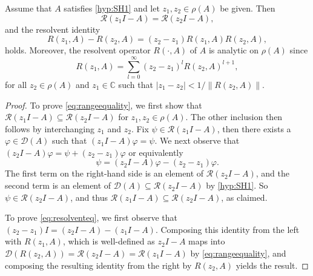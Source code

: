 \documentclass[english]{myarticle}
\begin{document}
\begin{sloppypar}
\begin{proposition} \label{prop:resolventproperties}
Assume that $A$ satisfies \ref{hyp:SH1} and let $z_1, z_2 \in \rho(A)$ be given. Then
\begin{equation} \label{eq:rangeequality}
    \mathcal{R}(z_1I - A) = \mathcal{R}(z_2I - A),
\end{equation}
and the resolvent identity
\begin{equation} \label{eq:resolventeq}
R(z_1,A)-R(z_2,A) = (z_2-z_1)R(z_1,A)R(z_2,A),
\end{equation}
holds. Moreover, the resolvent operator $R(\cdot,A)$ of $A$ is analytic on $\rho(A)$ since
\begin{equation} \label{eq:resolventseries}
    R(z_1,A) = \sum_{l=0}^{\infty} (z_2-z_1)^l R(z_2,A)^{l+1},
\end{equation}
for all $z_2 \in \rho(A)$ and $z_1 \in \mathbb{C}$ such that $|z_1 - z_2| < 1/ \|R(z_2,A)\|$.
\end{proposition}
\begin{proof}
To prove \eqref{eq:rangeequality}, we first show that $\mathcal{R}(z_1I - A) \subseteq \mathcal{R}(z_2I - A)$ for $z_{1},z_{2} \in \rho(A)$. The other inclusion then follows by interchanging $z_1$ and $z_2$. Fix $\psi \in \mathcal{R}(z_1I- A)$, then there exists a $\varphi \in \mathcal{D}(A)$ such that $(z_1I-A)\varphi = \psi$. We next observe that $(z_2 I - A) \varphi = \psi + (z_2 - z_1) \varphi$ or equivalently 
\begin{equation*}
\psi = (z_2 I - A) \varphi- (z_2 - z_1) \varphi.
\end{equation*}
The first term on the right-hand side is an element of $\mathcal{R}(z_2 I - A)$, and the second term is an element of $\mathcal{D}(A) \subseteq \mathcal{R}(z_2 I - A)$ by \ref{hyp:SH1}. So $\psi \in \mathcal{R}(z_2 I - A)$, and thus $\mathcal{R}(z_1 I - A) \subseteq \mathcal{R}(z_2 I - A)$, as claimed. 

To prove \eqref{eq:resolventeq}, we first observe that $(z_2 - z_1)I = (z_2 I - A) - (z_1 I - A)$. Composing this identity from the left with $R(z_1, A)$, which is well-defined as $z_2 I - A$ maps into 
$\mathcal{D}(R(z_2, A)) = \mathcal{R}(z_2 I - A) = \mathcal{R}(z_1 I - A)$ by \eqref{eq:rangeequality}, and composing the resulting identity from the right by $R(z_2, A)$ yields the result. 


\end{proof}
\end{sloppypar}
\end{document}
